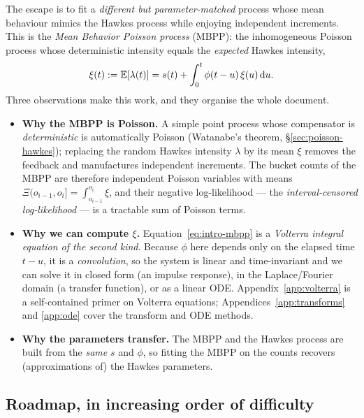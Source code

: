 The escape is to fit a \emph{different but parameter-matched} process whose mean
behaviour mimics the Hawkes process while enjoying independent increments. This is
the \emph{Mean Behavior Poisson process} (MBPP): the inhomogeneous Poisson process
whose deterministic intensity equals the \emph{expected} Hawkes intensity,
\begin{equation}
\xi(t):=\mathbb{E}[\lambda(t)]=s(t)+\int_0^t \phi(t-u)\,\xi(u)\,\mathrm{d} u .
\label{eq:intro-mbpp}
\end{equation}
Three observations make this work, and they organise the whole document.
\begin{itemize}[leftmargin=1.4em]
\item \textbf{Why the MBPP is Poisson.} A simple point process whose compensator
is \emph{deterministic} is automatically Poisson (Watanabe's theorem,
\S\ref{sec:poisson-hawkes}); replacing the random Hawkes intensity $\lambda$ by its
mean $\xi$ removes the feedback and manufactures independent increments. The bucket
counts of the MBPP are therefore independent Poisson variables with means
$\Xi(o_{i-1},o_i]=\int_{o_{i-1}}^{o_i}\xi$, and their negative log-likelihood ---
the \emph{interval-censored log-likelihood} --- is a tractable sum of Poisson
terms.
\item \textbf{Why we can compute $\xi$.} Equation~\eqref{eq:intro-mbpp} is a
\emph{Volterra integral equation of the second kind}. Because $\phi$ here depends
only on the elapsed time $t-u$, it is a \emph{convolution}, so the system is
linear and time-invariant and we can solve it in closed form (an impulse
response), in the Laplace/Fourier domain (a transfer function), or as a linear
ODE. Appendix~\ref{app:volterra} is a self-contained primer on Volterra equations;
Appendices~\ref{app:transforms} and \ref{app:ode} cover the transform and ODE
methods.
\item \textbf{Why the parameters transfer.} The MBPP and the Hawkes process are
built from the \emph{same} $s$ and $\phi$, so fitting the MBPP on the counts
recovers (approximations of) the Hawkes parameters.
\end{itemize}

\subsection{Roadmap, in increasing order of difficulty}

